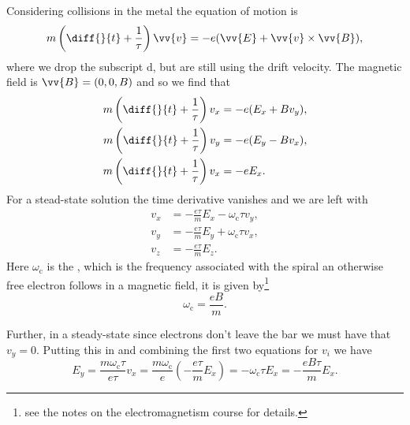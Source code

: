 \documentclass[fleqn]{NotesClass}
\begin{document}
    Considering collisions in the metal the equation of motion is
    \begin{equation}
        m\left( \diff{}{t} + \frac{1}{\tau} \right)\vv{v} = -e(\vv{E} + \vv{v} \times \vv{B}),
    \end{equation}
    where we drop the subscript \(\mathrm{d}\), but are still using the drift velocity.
    The magnetic field is \(\vv{B} = (0, 0, B)\) and so we find that
    \begin{align}
        m\left( \diff{}{t} + \frac{1}{\tau} \right) v_x &= -e(E_x + Bv_y),\\
        m\left( \diff{}{t} + \frac{1}{\tau} \right) v_y &= -e(E_y - Bv_x),\\
        m\left( \diff{}{t} + \frac{1}{\tau} \right) v_x &= -eE_x.\\
    \end{align}
    For a stead-state solution the time derivative vanishes and we are left with
    \begin{align}
        v_x &= -\frac{e\tau}{m}E_x - \omega_{\mathrm{c}}\tau v_y,\\
        v_y &= -\frac{e\tau}{m}E_y + \omega_{\mathrm{c}}\tau v_x,\\
        v_z &= -\frac{e\tau}{m}E_z.
    \end{align}
    Here \(\omega_{\mathrm{c}}\) is the , which is the frequency associated with the spiral an otherwise free electron follows in a magnetic field, it is given by\footnote{see the notes on the electromagnetism course for details.}
    \begin{equation}
        \omega_{\mathrm{c}} = \frac{eB}{m}.
    \end{equation}
    
    Further, in a steady-state since electrons don't leave the bar we must have that \(v_y = 0\).
    Putting this in and combining the first two equations for \(v_i\) we have
    \begin{equation}\label{eqn:Ex and Ey relation hall effect}
        E_y = \frac{m\omega_{\mathrm{c}}\tau}{e\tau}v_x = \frac{m\omega_{\mathrm{c}}}{e} \left( -\frac{e\tau}{m}E_x \right) = -\omega_{\mathrm{c}}\tau E_x = -\frac{eB\tau}{m}E_x.
    \end{equation}
    
\end{document}
